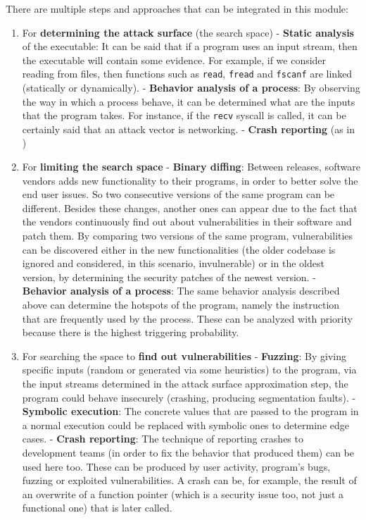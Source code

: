 \documentclass[12pt,a4paper,english,onecolumn]{IEEEtran}
\begin{document}
There are multiple steps and approaches that can be integrated in this module:
\begin{enumerate}
    \item For \textbf{determining the attack surface} (the search space)
    - \textbf{Static analysis} of the executable: It can be said that if a program uses an input stream, then the executable will contain some evidence. For example, if we consider reading from files, then functions such as \texttt{read}, \texttt{fread} and \texttt{fscanf} are linked (statically or dynamically).
    - \textbf{Behavior analysis of a process}: By observing the way in which a process behave, it can be determined what are the inputs that the program takes. For instance, if the \texttt{recv} syscall is called, it can be certainly said that an attack vector is networking.
    - \textbf{Crash reporting} (as in \cite{automated_approximation})
    \item  For \textbf{limiting the search space}
    - \textbf{Binary diffing}: Between releases, software vendors adds new functionality to their programs, in order to better solve the end user issues. So two consecutive versions of the same program can be different. Besides these changes, another ones can appear due to the fact that the vendors continuously find out about vulnerabilities in their software and patch them. By comparing two versions of the same program, vulnerabilities can be discovered either in the new functionalities (the older codebase is ignored and considered, in this scenario, invulnerable) or in the oldest version, by determining the security patches of the newest version.
    - \textbf{Behavior analysis of a process}: The same behavior analysis described above can determine the hotspots of the program, namely the instruction that are frequently used by the process. These can be analyzed with priority because there is the highest triggering probability.
    \item  For searching the space to \textbf{find out vulnerabilities}
    - \textbf{Fuzzing}: By giving specific inputs (random or generated via some heuristics) to the program, via the input streams determined in the attack surface approximation step, the program could behave insecurely (crashing, producing segmentation faults).
    - \textbf{Symbolic execution}: The concrete values that are passed to the program in a normal execution could be replaced with symbolic ones to determine edge cases. 
    - \textbf{Crash reporting}: The technique of reporting crashes to development teams (in order to fix the behavior that produced them) can be used here too. These can be produced by user activity, program's bugs, fuzzing or exploited vulnerabilities. A crash can be, for example, the result of an overwrite of a function pointer (which is a security issue too, not just a functional one) that is later called.

\end{enumerate}
\end{document}
